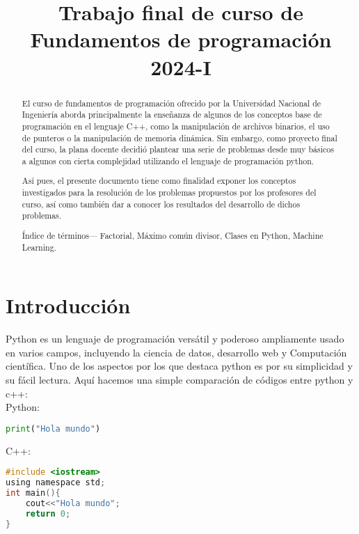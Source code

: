 \documentclass[conference]{IEEEtran}
\begin{document}
\title{\bf{Trabajo final de curso de Fundamentos de programación 2024-I}}

\author{
\and
{}
}

\maketitle

\begin{abstract}
El curso de fundamentos de programación ofrecido por la Universidad Nacional de Ingeniería
aborda principalmente la enseñanza de algunos de los conceptos base de programación en el 
lenguaje C++, como la manipulación de archivos binarios, el uso de punteros o la manipulación
de memoria dinámica. Sin embargo, como proyecto final del curso, la plana docente decidió
plantear una serie de problemas desde muy básicos a algunos con cierta complejidad utilizando
el lenguaje de programación python.

Así pues, el presente documento tiene como finalidad exponer los conceptos
investigados para la resolución de los problemas propuestos por los profesores
del curso, así como también dar a conocer los resultados del desarrollo de dichos
problemas.
\vspace{0.2cm}


Índice de términos— Factorial, Máximo común divisor, Clases en Python, Machine Learning.
    
\end{abstract}

\section{Introducci\'on}
Python es un lenguaje de programación versátil y poderoso ampliamente usado
en varios campos, incluyendo la ciencia de datos, desarrollo web y Computación científica.
Uno de los aspectos por los que destaca python es por su simplicidad y su fácil lectura.
Aquí hacemos una simple comparación de códigos entre python y c++:
\\
Python:
\begin{lstlisting}[language=Python,basicstyle=\small,caption=Script de bienvenida en Python]
print("Hola mundo")
\end{lstlisting}
\vspace{0.2cm}
C++:
\begin{lstlisting}[language=C,basicstyle=\small,caption=Script de bienvenida en C++]
#include <iostream>
using namespace std;
int main(){
	cout<<"Hola mundo";
	return 0;
}
\end{lstlisting}
\end{document}
